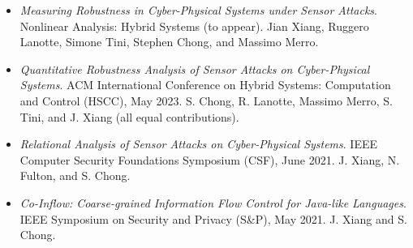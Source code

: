 \documentclass[12pt]{article}
\begin{document}
\begin{itemize}  \setlength\itemsep{3pt}

\item \textit{Measuring Robustness in Cyber-Physical Systems under Sensor Attacks}. Nonlinear Analysis: Hybrid Systems (to appear). 
Jian Xiang, Ruggero Lanotte, Simone Tini, Stephen Chong, and Massimo Merro.

\item \textit{Quantitative Robustness Analysis of Sensor Attacks on Cyber-Physical Systems}.
  ACM International Conference on Hybrid Systems: Computation and Control (HSCC), May 2023. 
  S. Chong, R. Lanotte, Massimo Merro, S. Tini, and J. Xiang (all equal contributions).
\item \textit{Relational Analysis of Sensor Attacks on Cyber-Physical Systems}.
  IEEE Computer Security Foundations Symposium (CSF),  June 2021. {J. Xiang}, N. Fulton, and S. Chong. 
  
\item \textit{Co-Inflow: Coarse-grained Information Flow Control for Java-like Languages}.
  IEEE Symposium on Security and Privacy (S\&P), May 2021.
  {J. Xiang} and S. Chong. 

\end{itemize}
\end{document}
